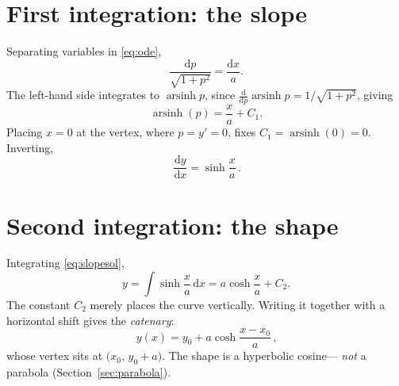 \documentclass[11pt]{article}
\theoremstyle{remark}
\newcommand{\dd}{\mathrm{d}}
\newcommand{\arsinh}{\operatorname{arsinh}}
\begin{document}
\section{First integration: the slope}
Separating variables in \eqref{eq:ode},
\begin{equation}
  \frac{\dd p}{\sqrt{1+p^2}} = \frac{\dd x}{a}.
\end{equation}
The left-hand side integrates to $\arsinh p$, since
$\tfrac{\dd}{\dd p}\arsinh p = 1/\sqrt{1+p^2}$, giving
\begin{equation}
  \arsinh(p) = \frac{x}{a} + C_1.
\end{equation}
Placing $x=0$ at the vertex, where $p=y'=0$, fixes $C_1=\arsinh(0)=0$. Inverting,
\begin{equation}
  \boxed{\,\frac{\dd y}{\dd x} = \sinh\frac{x}{a}\,}.
  \label{eq:slopesol}
\end{equation}

\section{Second integration: the shape}
Integrating \eqref{eq:slopesol},
\begin{equation}
  y = \int \sinh\frac{x}{a}\,\dd x = a\cosh\frac{x}{a} + C_2.
\end{equation}
The constant $C_2$ merely places the curve vertically. Writing it together with a
horizontal shift gives the \emph{catenary}:
\begin{equation}
  \boxed{\,y(x) = y_0 + a\cosh\frac{x-x_0}{a}\,},
  \label{eq:catenary}
\end{equation}
whose vertex sits at $\big(x_0,\,y_0+a\big)$. The shape is a hyperbolic cosine---%
\emph{not} a parabola (Section~\ref{sec:parabola}).
\end{document}
